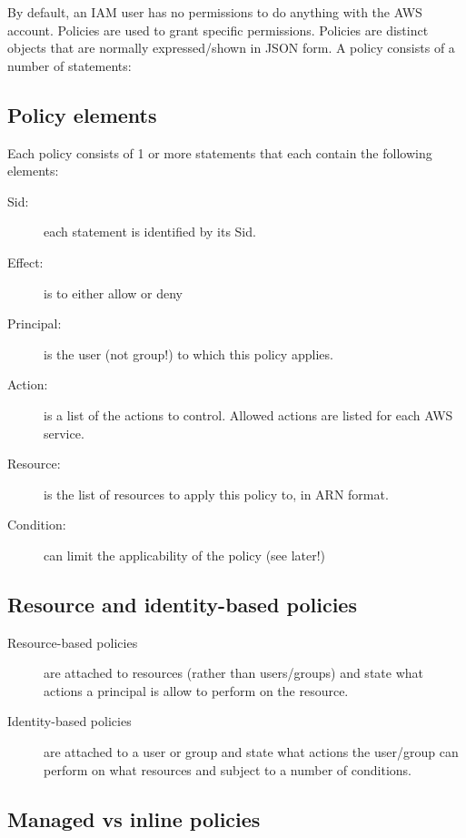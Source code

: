 By default, an IAM user has no permissions to do anything with the AWS
account. Policies are used to grant specific permissions. Policies are
distinct objects that are normally expressed/shown in JSON form. A
policy consists of a number of statements:

\subsection{Policy elements}\label{policy-elements}

Each policy consists of 1 or more statements that each contain the
following elements:

\begin{description}
\item[Sid:]
each statement is identified by its Sid.
\item[Effect:]
is to either allow or deny
\item[Principal:]
is the user (not group!) to which this policy applies.
\item[Action:]
is a list of the actions to control. Allowed actions are listed for each
AWS service.
\item[Resource:]
is the list of resources to apply this policy to, in ARN format.
\item[Condition:]
can limit the applicability of the policy (see later!)
\end{description}

\subsection{Resource and identity-based
policies}\label{resource-and-identity-based-policies}

\begin{description}
\item[Resource-based policies]
are attached to resources (rather than users/groups) and state what
actions a principal is allow to perform on the resource.
\item[Identity-based policies]
are attached to a user or group and state what actions the user/group
can perform on what resources and subject to a number of conditions.
\end{description}

\subsection{Managed vs inline
policies}\label{managed-vs-inline-policies}


